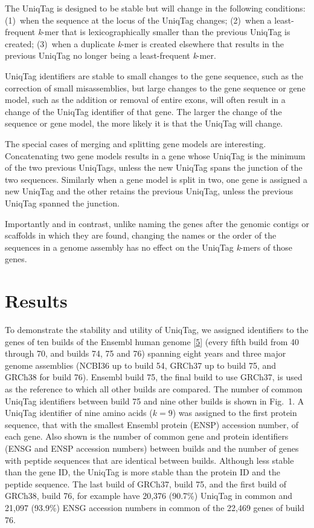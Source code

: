 \documentclass[10pt]{article}
\begin{document}
The UniqTag is designed to be stable but will change in the following
conditions: (1)~when the sequence at the locus of the UniqTag changes;
(2)~when a least-frequent \emph{k}-mer that is lexicographically smaller
than the previous UniqTag is created; (3)~when a duplicate \emph{k}-mer
is created elsewhere that results in the previous UniqTag no longer
being a least-frequent \emph{k}-mer.

UniqTag identifiers are stable to small changes to the gene sequence,
such as the correction of small misassemblies, but large changes to the
gene sequence or gene model, such as the addition or removal of entire
exons, will often result in a change of the UniqTag identifier of that
gene. The larger the change of the sequence or gene model, the more
likely it is that the UniqTag will change.

The special cases of merging and splitting gene models are interesting.
Concatenating two gene models results in a gene whose UniqTag is the
minimum of the two previous UniqTags, unless the new UniqTag spans the
junction of the two sequences. Similarly when a gene model is split in
two, one gene is assigned a new UniqTag and the other retains the
previous UniqTag, unless the previous UniqTag spanned the junction.

Importantly and in contrast, unlike naming the genes after the genomic
contigs or scaffolds in which they are found, changing the names or the
order of the sequences in a genome assembly has no effect on the UniqTag
\emph{k}-mers of those genes.

\section{Results}\label{results}

To demonstrate the stability and utility of UniqTag, we assigned
identifiers to the genes of ten builds of the Ensembl human genome
{[}\href{http://dx.doi.org/10.1093/nar/gku1010}{5}{]} (every fifth build
from 40 through 70, and builds 74, 75 and 76) spanning eight years and
three major genome assemblies (NCBI36 up to build 54, GRCh37 up to build
75, and GRCh38 for build 76). Ensembl build 75, the final build to use
GRCh37, is used as the reference to which all other builds are compared.
The number of common UniqTag identifiers between build 75 and nine other
builds is shown in Fig.~1. A UniqTag identifier of nine amino acids
(\(k=9\)) was assigned to the first protein sequence, that with the
smallest Ensembl protein (ENSP) accession number, of each gene. Also
shown is the number of common gene and protein identifiers (ENSG and
ENSP accession numbers) between builds and the number of genes with
peptide sequences that are identical between builds. Although less
stable than the gene ID, the UniqTag is more stable than the protein ID
and the peptide sequence. The last build of GRCh37, build 75, and the
first build of GRCh38, build 76, for example have 20,376 (90.7\%)
UniqTag in common and 21,097 (93.9\%) ENSG accession numbers in common
of the 22,469 genes of build 76.
\end{document}
